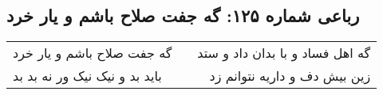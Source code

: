 \begin{center}
\section*{رباعی شماره ۱۲۵: گه جفت صلاح باشم و یار خرد}
\label{sec:sh125}
\begin{longtable}{l p{0.5cm} r}
گه جفت صلاح باشم و یار خرد
&&
گه اهل فساد و با بدان داد و ستد
\\
باید بد و نیک نیک ور نه بد بد
&&
زین بیش دف و داریه نتوانم زد
\\
\end{longtable}
\end{center}
